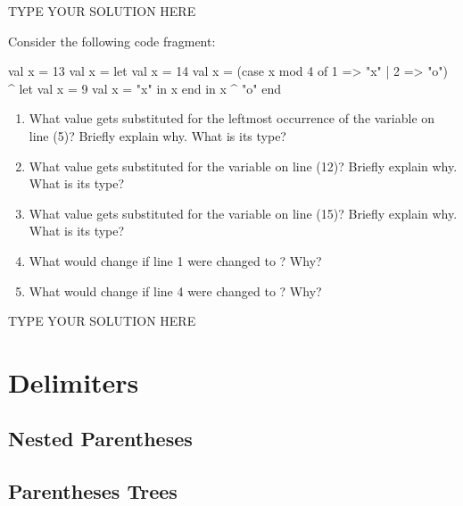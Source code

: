 \documentclass[11pt]{article}
\begin{document}
\begin{solution}
TYPE YOUR SOLUTION HERE
\end{solution}


\begin{task}{6} %
Consider the following code fragment:
\begin{sml}[numbers=left]
val x = 13
val x =
    let
      val x = 14
      val x = (case x mod 4
                of 1 => "x"
                 | 2 => "o") ^
              let
                val x = 9
                val x = "x"
              in
                x
              end
    in
      x ^ "o"
    end
\end{sml}

\begin{enumerate}
\item%
  What value gets substituted for the leftmost occurrence of the variable
   on line (5)?  Briefly explain why.  What is its type?
\item%
  What value gets substituted for the variable  on line (12)?  Briefly
  explain why.  What is its type?
\item%
  What value gets substituted for the variable  on line (15)?  Briefly
  explain why.  What is its type?
\item%
  What would change if line 1 were changed to ? Why?
\item%
  What would change if line 4 were changed to ? Why?
\end{enumerate}
\end{task}

\begin{solution}
TYPE YOUR SOLUTION HERE
\end{solution}


\section{Delimiters}

\subsection{Nested Parentheses}

\addtocounter{taskNum}{1}
\subsection{Parentheses Trees}

\addtocounter{taskNum}{1}
\addtocounter{taskNum}{1}
\addtocounter{taskNum}{1}
\end{document}
